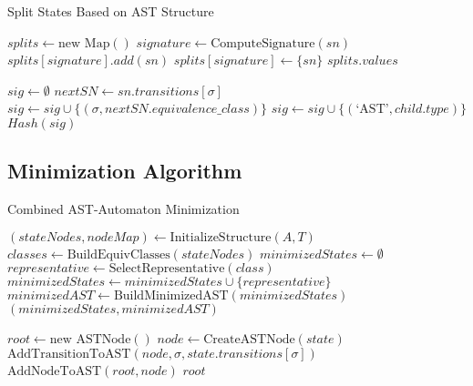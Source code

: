 \documentclass[12pt]{article}
\begin{document}
\begin{algorithm}
\caption{Split States Based on AST Structure}
\begin{algorithmic}[1]
    \State $splits \gets \text{new Map}()$
        \State $signature \gets \text{ComputeSignature}(sn)$
            \State $splits[signature].add(sn)$
        \Else
            \State $splits[signature] \gets \{sn\}$
        \EndIf
    \EndFor
    \State \Return $splits.values$
\EndProcedure

    \State $sig \gets \emptyset$
    \For{$\sigma \in \Sigma$}
        \State $nextSN \gets sn.transitions[\sigma]$
        \State $sig \gets sig \cup \{(\sigma, nextSN.equivalence\_class)\}$
    \EndFor
        \State $sig \gets sig \cup \{(\text{`AST'}, child.type)\}$
    \EndFor
    \State \Return $Hash(sig)$
\EndProcedure
\end{algorithmic}
\end{algorithm}

\subsection{Minimization Algorithm}

\begin{algorithm}
\caption{Combined AST-Automaton Minimization}
\begin{algorithmic}[1]
    \State $(stateNodes, nodeMap) \gets \text{InitializeStructure}(A, T)$
    \State $classes \gets \text{BuildEquivClasses}(stateNodes)$
    \State $minimizedStates \gets \emptyset$
        \State $representative \gets \text{SelectRepresentative}(class)$
        \State $minimizedStates \gets minimizedStates \cup \{representative\}$
    \EndFor
    \State $minimizedAST \gets \text{BuildMinimizedAST}(minimizedStates)$
    \State \Return $(minimizedStates, minimizedAST)$
\EndProcedure

    \State $root \gets \text{new ASTNode}()$
        \State $node \gets \text{CreateASTNode}(state)$
        \For{$\sigma \in \Sigma$}
                \State $\text{AddTransitionToAST}(node, \sigma, state.transitions[\sigma])$
            \EndIf
        \EndFor
        \State $\text{AddNodeToAST}(root, node)$
    \EndFor
    \State \Return $root$
\EndProcedure
\end{algorithmic}
\end{algorithm}
\end{document}
